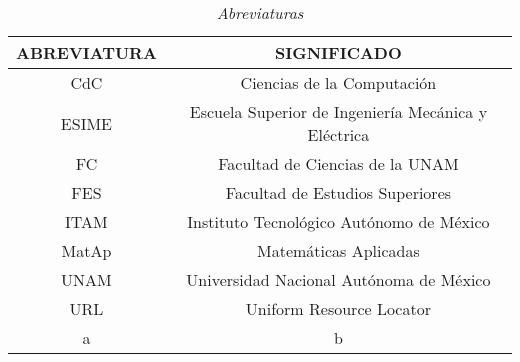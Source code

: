 \begin{table}[H]
\centering
\begin{tabular}{|c|c|}
\hline 
 ABREVIATURA & SIGNIFICADO \\ 
\hline 
 CdC & Ciencias de la Computación \\ 
\hline 
 ESIME & Escuela Superior de Ingeniería Mecánica y Eléctrica\\ 
\hline 
 FC & Facultad de Ciencias de la UNAM \\ 
\hline 
 FES & Facultad de Estudios Superiores \\
\hline 
 ITAM & Instituto Tecnológico Autónomo de México \\ 
\hline 
 MatAp & Matemáticas Aplicadas \\ 
\hline 
 UNAM & Universidad Nacional Autónoma de México \\ 
\hline 
 URL & Uniform Resource Locator \\ 
\hline 
 a & b \\ 
\hline 
\end{tabular} 
\caption{\textit{Abreviaturas}}
\end{table}

